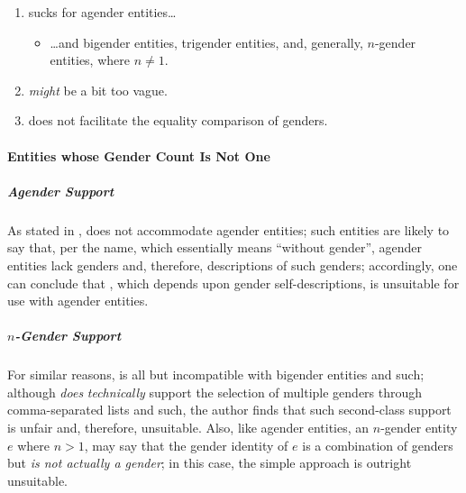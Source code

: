 \documentclass{article}
\begin{document}
\begin{enumerate}
  \item {} sucks for agender entities\ldots{}\label{enum:gender1agender}
  \begin{itemize}
    \item \ldots and bigender entities, trigender entities, and, generally, \(n\)-gender entities, where \(n \neq 1\).
  \end{itemize}
  \item {} \emph{might} be a bit too vague.
  \item {} does not facilitate the equality comparison of genders.
\end{enumerate}

\paragraph{Entities whose Gender Count Is Not One}
\subparagraph{Agender Support}
As stated in ,  does not accommodate agender entities; such entities are likely to say that,\cite{healthline-agender}\cite{lgbtqia-wiki-agender} per the name, which essentially means ``without gender'',\cite{lgbtqia-wiki-agender} agender entities lack genders and, therefore, descriptions of such genders; accordingly, one can conclude that , which depends upon gender self-descriptions, is unsuitable for use with agender entities.

\subparagraph{\(n\)-Gender Support}
For similar reasons,  is all but incompatible with bigender entities and such; although  \emph{does} \emph{technically} support the selection of multiple genders through comma-separated lists and such, the author finds that such second-class support is unfair and, therefore, unsuitable.  Also, like agender entities, an \(n\)-gender entity \(e\) where \(n > 1\), may say that the gender identity of \(e\) is a combination of genders but \emph{is not actually a gender}; in this case, the simple  approach is outright unsuitable.

\printbibliography{}
\end{document}
